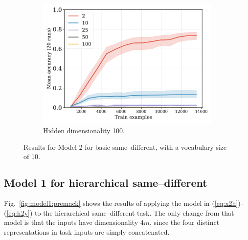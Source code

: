 \documentclass[12pt]{article}
\newcommand{\Figref}[1]{Fig.~\ref{#1}}
\newcommand{\eg}[1]{(\ref{#1})}
\newcommand{\dasheg}[2]{\eg{#1}--\eg{#2}}
\begin{document}
\begin{figure}[H]
  \begin{subfigure}{0.45\linewidth}
    \includegraphics[width=1\textwidth]{fig/fuzzy-lm-vocab10-train_size-embed_dim-hidden_dim=100.pdf}
    \caption{Hidden dimensionality 100.}
  \end{subfigure}
  \caption{Results for Model 2 for basic same--different, with a vocabulary size of 10.}
  \label{fig:model2:vocab10}
\end{figure}


\newpage

\subsection{Model 1 for hierarchical same--different}

\Figref{fig:model1:premack} shows the results of applying the model in \dasheg{eq:x2h}{eq:h2y} to the hierarchical same--different task. The only change from that model is that the inputs have dimensionality $4m$, since the four distinct representations in task inputs are simply concatenated.
\end{document}
